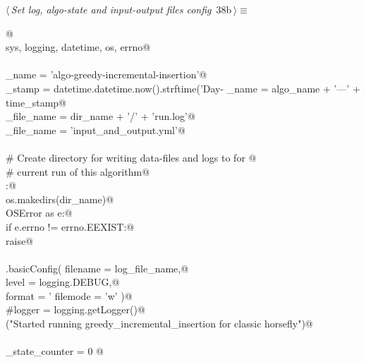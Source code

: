 \documentclass[11.5pt]{report}
\begin{document}
\begin{flushleft} \small\label{scrap47}\raggedright\small
{} $\langle\,${\itshape Set log, algo-state and input-output files config}\nobreak\ {\footnotesize {38b}}$\,\rangle\equiv$
\vspace{-1ex}
\begin{list}{}{} \item
\mbox{}\verb@  @\\
\mbox{}\verb@import sys, logging, datetime, os, errno@\\
\mbox{}\verb@@\\
\mbox{}\verb@algo_name     = 'algo-greedy-incremental-insertion'@\\
\mbox{}\verb@time_stamp    = datetime.datetime.now().strftime('Day-%Y-%m-%d_ClockTime-%H:%M:%S')@\\
\mbox{}\verb@dir_name      = algo_name + '---' + time_stamp@\\
\mbox{}\verb@log_file_name = dir_name + '/' + 'run.log'@\\
\mbox{}\verb@io_file_name  = 'input_and_output.yml'@\\
\mbox{}\verb@@\\
\mbox{}\verb@# Create directory for writing data-files and logs to for @\\
\mbox{}\verb@# current run of this algorithm@\\
\mbox{}\verb@try:@\\
\mbox{}\verb@    os.makedirs(dir_name)@\\
\mbox{}\verb@except OSError as e:@\\
\mbox{}\verb@    if e.errno != errno.EEXIST:@\\
\mbox{}\verb@        raise@\\
\mbox{}\verb@@\\
\mbox{}\verb@logging.basicConfig( filename = log_file_name,@\\
\mbox{}\verb@                     level    = logging.DEBUG,@\\
\mbox{}\verb@                     format   = '%(asctime)s: %(levelname)s: %(message)s',@\\
\mbox{}\verb@                     filemode = 'w' )@\\
\mbox{}\verb@#logger = logging.getLogger()@\\
\mbox{}\verb@info("Started running greedy_incremental_insertion for classic horsefly")@\\
\mbox{}\verb@@\\
\mbox{}\verb@algo_state_counter = 0 @\\

\end{list}
\end{flushleft}
\end{document}
